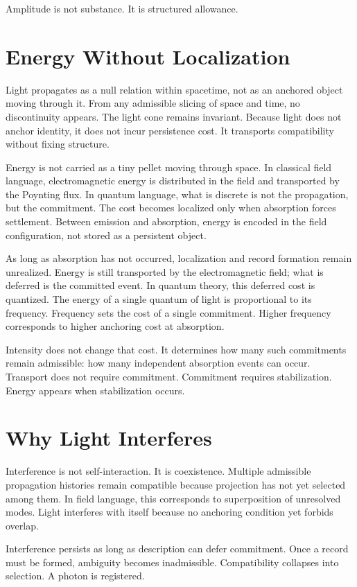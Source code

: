 \documentclass[11pt,twoside,openright]{book}
\begin{document}
Amplitude is not substance. It is structured allowance.

\section*{Energy Without Localization}

Light propagates as a null relation within spacetime, not as an anchored object moving through it. From any admissible slicing of space and time, no discontinuity appears. The light cone remains invariant. Because light does not anchor identity, it does not incur persistence cost. It transports compatibility without fixing structure.

Energy is not carried as a tiny pellet moving through space. In classical field language, electromagnetic energy is distributed in the field and transported by the Poynting flux. In quantum language, what is discrete is not the propagation, but the commitment. The cost becomes localized only when absorption forces settlement. Between emission and absorption, energy is encoded in the field configuration, not stored as a persistent object.

As long as absorption has not occurred, localization and record formation remain unrealized. Energy is still transported by the electromagnetic field; what is deferred is the committed event. In quantum theory, this deferred cost is quantized. The energy of a single quantum of light is proportional to its frequency. Frequency sets the cost of a single commitment. Higher frequency corresponds to higher anchoring cost at absorption.

Intensity does not change that cost. It determines how many such commitments remain admissible: how many independent absorption events can occur. Transport does not require commitment. Commitment requires stabilization. Energy appears when stabilization occurs.

\section*{Why Light Interferes}

Interference is not self-interaction. It is coexistence. Multiple admissible propagation histories remain compatible because projection has not yet selected among them. In field language, this corresponds to superposition of unresolved modes. Light interferes with itself because no anchoring condition yet forbids overlap.

Interference persists as long as description can defer commitment. Once a record must be formed, ambiguity becomes inadmissible. Compatibility collapses into selection. A photon is registered.
\end{document}

